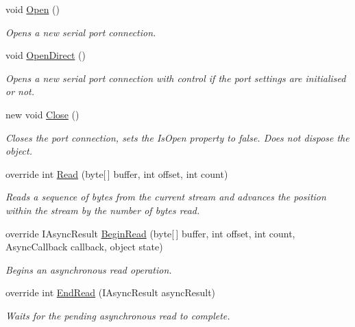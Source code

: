 \begin{DoxyCompactItemize}
void \mbox{\hyperlink{class_r_j_c_p_1_1_i_o_1_1_ports_1_1_serial_port_stream_aea440d3c8584ce6f55dc63e57f473198}{Open}} ()
\begin{DoxyCompactList}\small\item\em Opens a new serial port connection. \end{DoxyCompactList}\item 
void \mbox{\hyperlink{class_r_j_c_p_1_1_i_o_1_1_ports_1_1_serial_port_stream_a70baceb9a6f16383320da15e2508b4c1}{Open\+Direct}} ()
\begin{DoxyCompactList}\small\item\em Opens a new serial port connection with control if the port settings are initialised or not. \end{DoxyCompactList}\item 
new void \mbox{\hyperlink{class_r_j_c_p_1_1_i_o_1_1_ports_1_1_serial_port_stream_a7b8503fb40902f1d64f6fa8bd195a900}{Close}} ()
\begin{DoxyCompactList}\small\item\em Closes the port connection, sets the Is\+Open property to false. Does not dispose the object. \end{DoxyCompactList}\item 
override int \mbox{\hyperlink{class_r_j_c_p_1_1_i_o_1_1_ports_1_1_serial_port_stream_aef563c280dc4f77d6977ec143c5bdd0e}{Read}} (byte\mbox{[}$\,$\mbox{]} buffer, int offset, int count)
\begin{DoxyCompactList}\small\item\em Reads a sequence of bytes from the current stream and advances the position within the stream by the number of bytes read. \end{DoxyCompactList}\item 
override I\+Async\+Result \mbox{\hyperlink{class_r_j_c_p_1_1_i_o_1_1_ports_1_1_serial_port_stream_a1ae2e7d518dbeb421240f0f1acf595a2}{Begin\+Read}} (byte\mbox{[}$\,$\mbox{]} buffer, int offset, int count, Async\+Callback callback, object state)
\begin{DoxyCompactList}\small\item\em Begins an asynchronous read operation. \end{DoxyCompactList}\item 
override int \mbox{\hyperlink{class_r_j_c_p_1_1_i_o_1_1_ports_1_1_serial_port_stream_a91130f485bc8584398e7d36377a126be}{End\+Read}} (I\+Async\+Result async\+Result)
\begin{DoxyCompactList}\small\item\em Waits for the pending asynchronous read to complete. \end{DoxyCompactList}\item 

\end{DoxyCompactItemize}
